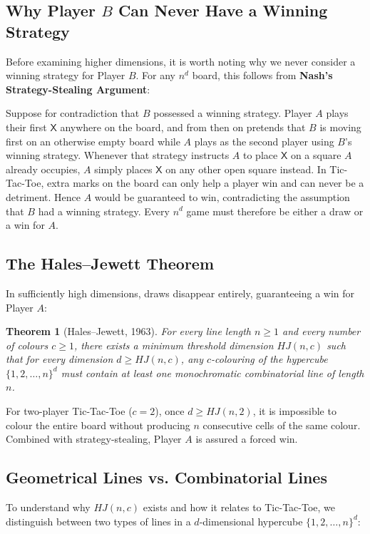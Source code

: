 \documentclass[11pt, a4paper]{article}
\newtheorem{theorem}{Theorem}
\begin{document}
\subsection{Why Player $B$ Can Never Have a Winning Strategy}
Before examining higher dimensions, it is worth noting why we never consider a winning strategy for Player $B$. For any $n^d$ board, this follows from \textbf{Nash's Strategy-Stealing Argument}:

Suppose for contradiction that $B$ possessed a winning strategy. Player $A$ plays their first $\mathsf{X}$ anywhere on the board, and from then on pretends that $B$ is moving first on an otherwise empty board while $A$ plays as the second player using $B$'s winning strategy. Whenever that strategy instructs $A$ to place $\mathsf{X}$ on a square $A$ already occupies, $A$ simply places $\mathsf{X}$ on any other open square instead. In Tic-Tac-Toe, extra marks on the board can only help a player win and can never be a detriment. Hence $A$ would be guaranteed to win, contradicting the assumption that $B$ had a winning strategy. Every $n^d$ game must therefore be either a draw or a win for $A$.

\subsection{The Hales--Jewett Theorem}
In sufficiently high dimensions, draws disappear entirely, guaranteeing a win for Player $A$:

\begin{theorem}[Hales--Jewett, 1963]
For every line length $n \ge 1$ and every number of colours $c \ge 1$, there exists a minimum threshold dimension $HJ(n, c)$ such that for every dimension $d \ge HJ(n, c)$, any $c$-colouring of the hypercube $\{1, 2, \dots, n\}^d$ must contain at least one monochromatic combinatorial line of length $n$.
\end{theorem}

For two-player Tic-Tac-Toe ($c = 2$), once $d \ge HJ(n, 2)$, it is impossible to colour the entire board without producing $n$ consecutive cells of the same colour. Combined with strategy-stealing, Player $A$ is assured a forced win.

\subsection{Geometrical Lines vs. Combinatorial Lines}
To understand why $HJ(n, c)$ exists and how it relates to Tic-Tac-Toe, we distinguish between two types of lines in a $d$-dimensional hypercube $\{1, 2, \dots, n\}^d$:
\end{document}
